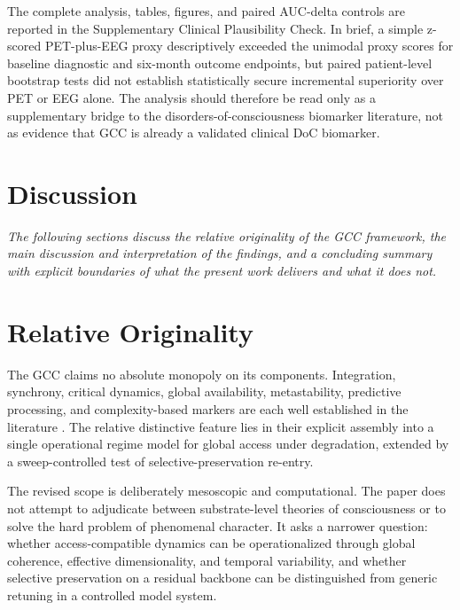﻿\documentclass[11pt,a4paper]{article}
\theoremstyle{plain}
\theoremstyle{definition}
\theoremstyle{remark}
\begin{document}
The complete analysis, tables, figures, and paired AUC-delta controls are reported in the Supplementary Clinical Plausibility Check. In brief, a simple z-scored PET-plus-EEG proxy descriptively exceeded the unimodal proxy scores for baseline diagnostic and six-month outcome endpoints, but paired patient-level bootstrap tests did not establish statistically secure incremental superiority over PET or EEG alone. The analysis should therefore be read only as a supplementary bridge to the disorders-of-consciousness biomarker literature, not as evidence that GCC is already a validated clinical DoC biomarker.


\section*{Discussion}

\noindent\textit{The following sections discuss the relative originality of the GCC framework, the main discussion and interpretation of the findings, and a concluding summary with explicit boundaries of what the present work delivers and what it does not.}

\section{Relative Originality}
\label{sec:originalitaet}

The GCC claims no absolute monopoly on its components. Integration, synchrony, critical dynamics, global availability, metastability, predictive processing, and complexity-based markers are each well established in the literature \citep{baars2005,dehaene1998,dehaene2001,dehaenechangeux2011,naccache2018,tononi2004,friston2010,fries2015,kelso2012,deco2017,casali2013,seth2011,king2013,demertzi2019,northoff2017,carhartharris2014,carhartharris2019}. The relative distinctive feature lies in their explicit assembly into a single operational regime model for global access under degradation, extended by a sweep-controlled test of selective-preservation re-entry.

The revised scope is deliberately mesoscopic and computational. The paper does not attempt to adjudicate between substrate-level theories of consciousness or to solve the hard problem of phenomenal character. It asks a narrower question: whether access-compatible dynamics can be operationalized through global coherence, effective dimensionality, and temporal variability, and whether selective preservation on a residual backbone can be distinguished from generic retuning in a controlled model system.
\end{document}
